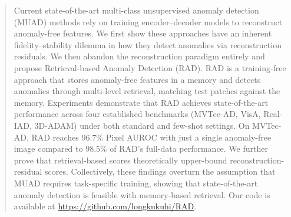 \documentclass{article}
\theoremstyle{plain}
\theoremstyle{definition}
\theoremstyle{remark}
\begin{document}
\begin{abstract}

Current state-of-the-art multi-class unsupervised anomaly detection (MUAD) methods rely on training encoder–decoder models to reconstruct anomaly-free features. We first show these approaches have an inherent fidelity–stability dilemma in how they detect anomalies via reconstruction residuals. We then abandon the reconstruction paradigm entirely and propose Retrieval-based Anomaly Detection (RAD). RAD is a training-free approach that stores anomaly-free features in a memory and detects anomalies through multi-level retrieval, matching test patches against the memory. 
Experiments demonstrate that RAD achieves state-of-the-art performance across four established benchmarks (MVTec-AD, VisA, Real-IAD, 3D-ADAM) under both standard and few-shot settings. On MVTec-AD, RAD reaches 96.7\% Pixel AUROC with just a single anomaly-free image compared to 98.5\% of RAD's full-data performance. 
We further prove that retrieval-based scores theoretically upper-bound reconstruction-residual scores. Collectively, these findings overturn the assumption that MUAD requires task-specific training, showing that state-of-the-art anomaly detection is feasible with memory-based retrieval. Our code is available at \url{https://github.com/longkukuhi/RAD}.


\end{abstract}
\end{document}
